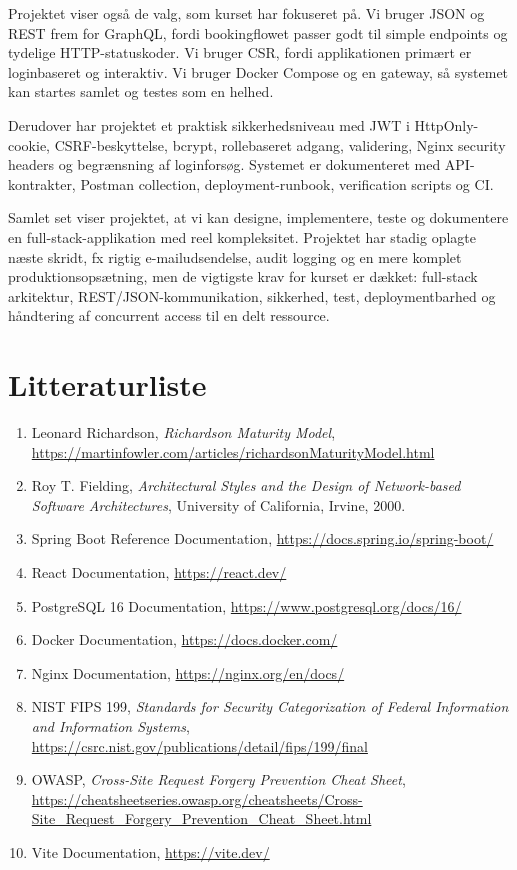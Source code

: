 \documentclass[11pt,a4paper]{article}
\begin{document}
Projektet viser også de valg, som kurset har fokuseret på. Vi bruger JSON og REST frem for GraphQL, fordi bookingflowet passer godt til simple endpoints og tydelige HTTP-statuskoder. Vi bruger CSR, fordi applikationen primært er loginbaseret og interaktiv. Vi bruger Docker Compose og en gateway, så systemet kan startes samlet og testes som en helhed.

Derudover har projektet et praktisk sikkerhedsniveau med JWT i HttpOnly-cookie, CSRF-beskyttelse, bcrypt, rollebaseret adgang, validering, Nginx security headers og begrænsning af loginforsøg. Systemet er dokumenteret med API-kontrakter, Postman collection, deployment-runbook, verification scripts og CI.

Samlet set viser projektet, at vi kan designe, implementere, teste og dokumentere en full-stack-applikation med reel kompleksitet. Projektet har stadig oplagte næste skridt, fx rigtig e-mailudsendelse, audit logging og en mere komplet produktionsopsætning, men de vigtigste krav for kurset er dækket: full-stack arkitektur, REST/JSON-kommunikation, sikkerhed, test, deploymentbarhed og håndtering af concurrent access til en delt ressource.

\section{Litteraturliste}

\begin{enumerate}
  \item Leonard Richardson, \textit{Richardson Maturity Model}, \url{https://martinfowler.com/articles/richardsonMaturityModel.html}
  \item Roy T. Fielding, \textit{Architectural Styles and the Design of Network-based Software Architectures}, University of California, Irvine, 2000.
  \item Spring Boot Reference Documentation, \url{https://docs.spring.io/spring-boot/}
  \item React Documentation, \url{https://react.dev/}
  \item PostgreSQL 16 Documentation, \url{https://www.postgresql.org/docs/16/}
  \item Docker Documentation, \url{https://docs.docker.com/}
  \item Nginx Documentation, \url{https://nginx.org/en/docs/}
  \item NIST FIPS 199, \textit{Standards for Security Categorization of Federal Information and Information Systems}, \url{https://csrc.nist.gov/publications/detail/fips/199/final}
  \item OWASP, \textit{Cross-Site Request Forgery Prevention Cheat Sheet}, \url{https://cheatsheetseries.owasp.org/cheatsheets/Cross-Site_Request_Forgery_Prevention_Cheat_Sheet.html}
  \item Vite Documentation, \url{https://vite.dev/}
\end{enumerate}
\end{document}
